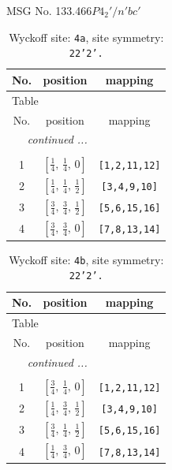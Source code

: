 \documentclass[fleqn,8pt]{jsarticle}
\begin{document}
\setcounter{MaxMatrixCols}{32}

\renewcommand{\tablename}{Table~}
\renewcommand{\figurename}{Figure~}
\begin{center}
\LARGE
MSG No. 133.466\quad$P4_{2}'/n'bc'$
\end{center}
\renewcommand{\arraystretch}{1.2}
\begin{longtable}{ccc}
\caption{Wyckoff site: {\tt 4a}, site symmetry: {\tt 22'2'.}}
 \\
 \hline \hline
No. & position & mapping \\ \hline \endfirsthead

\multicolumn{2}{l}{\tablename\ \thetable{}} \\
 \hline \hline
No. & position & mapping \\ \hline \endhead

 \hline \hline
\multicolumn{2}{r}{\footnotesize\it continued ...} \\ \endfoot

 \hline \hline
\multicolumn{2}{r}{} \\ \endlastfoot

1 & $\left[ \frac{1}{4},\, \frac{1}{4},\, 0 \right]$ & {\tt [1,2,11,12]} \\ \hline
2 & $\left[ \frac{1}{4},\, \frac{1}{4},\, \frac{1}{2} \right]$ & {\tt [3,4,9,10]} \\ \hline
3 & $\left[ \frac{3}{4},\, \frac{3}{4},\, \frac{1}{2} \right]$ & {\tt [5,6,15,16]} \\ \hline
4 & $\left[ \frac{3}{4},\, \frac{3}{4},\, 0 \right]$ & {\tt [7,8,13,14]} \\
\end{longtable}
\renewcommand{\arraystretch}{1.2}
\begin{longtable}{ccc}
\caption{Wyckoff site: {\tt 4b}, site symmetry: {\tt 22'2'.}}
 \\
 \hline \hline
No. & position & mapping \\ \hline \endfirsthead

\multicolumn{2}{l}{\tablename\ \thetable{}} \\
 \hline \hline
No. & position & mapping \\ \hline \endhead

 \hline \hline
\multicolumn{2}{r}{\footnotesize\it continued ...} \\ \endfoot

 \hline \hline
\multicolumn{2}{r}{} \\ \endlastfoot

1 & $\left[ \frac{3}{4},\, \frac{1}{4},\, 0 \right]$ & {\tt [1,2,11,12]} \\ \hline
2 & $\left[ \frac{1}{4},\, \frac{3}{4},\, \frac{1}{2} \right]$ & {\tt [3,4,9,10]} \\ \hline
3 & $\left[ \frac{3}{4},\, \frac{1}{4},\, \frac{1}{2} \right]$ & {\tt [5,6,15,16]} \\ \hline
4 & $\left[ \frac{1}{4},\, \frac{3}{4},\, 0 \right]$ & {\tt [7,8,13,14]} \\
\end{longtable}
\end{document}
